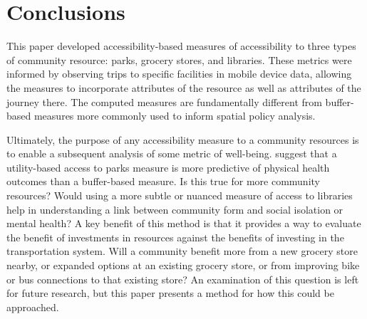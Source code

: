 \documentclass[ijerph,article,submit,moreauthors,pdftex]{mdpi}
\begin{document}
\hypertarget{conclusions}{%
\section{Conclusions}\label{conclusions}}

This paper developed accessibility-based measures of accessibility to three
types of community resource: parks, grocery stores, and libraries. These metrics
were informed by observing trips to specific facilities in mobile
device data, allowing the measures to incorporate attributes of the resource
as well as attributes of the journey there. The computed measures are
fundamentally different from buffer-based measures more commonly used to
inform spatial policy analysis.

Ultimately, the purpose of any accessibility measure to a community resources
is to enable a subsequent analysis of some metric of well-being. \citet{macfarlane2020}
suggest that a utility-based access to parks measure is more predictive of
physical health outcomes than a buffer-based measure. Is this true for more
community resources? Would using a more subtle or nuanced measure of access to
libraries help in understanding a link between community form and social isolation
or mental health? A key benefit of this method is that it provides a way to
evaluate the benefit of investments in resources against the benefits of investing
in the transportation system. Will a community benefit more from a new grocery store
nearby, or expanded options at an existing grocery store, or from improving bike
or bus connections to that existing store? An examination of this question is
left for future research, but this paper presents a method for how this could be
approached.

%

\vspace{6pt}

\end{document}
